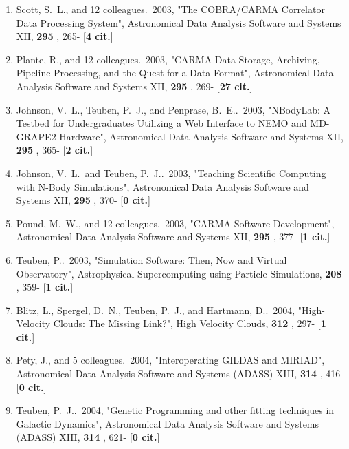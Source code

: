 \documentclass[11pt,letterpaper]{article}
\begin{document}
\begin{enumerate}[resume,label=\textbf{\arabic*}.]
\item  
Scott, S.~L., and 12 colleagues.\  2003,  "The COBRA/CARMA Correlator Data 
Processing System", Astronomical Data Analysis Software and Systems XII,  
{\bf 295} , 265- [{\bf 4 cit.}] 

\item  
Plante, R., and 12 colleagues.\  2003,  "CARMA Data Storage, Archiving, 
Pipeline Processing, and the Quest for a Data Format", Astronomical Data 
Analysis Software and Systems XII,  {\bf 295} , 269- [{\bf 27 cit.}] 

\item  
Johnson, V.~L., Teuben, P.~J., and Penprase, B.~E..\  2003,  "NBodyLab: A 
Testbed for Undergraduates Utilizing a Web Interface to NEMO and MD-GRAPE2 
Hardware", Astronomical Data Analysis Software and Systems XII,  {\bf 295} 
, 365- [{\bf 2 cit.}] 

\item  
Johnson, V.~L.~and Teuben, P.~J..\  2003,  "Teaching Scientific Computing 
with N-Body Simulations", Astronomical Data Analysis Software and Systems 
XII,  {\bf 295} , 370- [{\bf 0 cit.}] 

\item  
Pound, M.~W., and 12 colleagues.\  2003,  "CARMA Software Development", 
Astronomical Data Analysis Software and Systems XII,  {\bf 295} , 377- 
[{\bf 1 cit.}] 

\item  
Teuben, P..\  2003,  "Simulation Software: Then, Now and Virtual 
Observatory", Astrophysical Supercomputing using Particle Simulations,  
{\bf 208} , 359- [{\bf 1 cit.}] 


\item  
Blitz, L., Spergel, D.~N., Teuben, P.~J., and Hartmann, D..\  2004,  
"High-Velocity Clouds: The Missing Link?", High Velocity Clouds,  {\bf 312} 
, 297- [{\bf 1 cit.}] 

\item  
Pety, J., and 5 colleagues.\  2004,  "Interoperating GILDAS and MIRIAD", 
Astronomical Data Analysis Software and Systems (ADASS) XIII,  {\bf 314} , 
416- [{\bf 0 cit.}] 

\item  
Teuben, P.~J..\  2004,  "Genetic Programming and other fitting techniques 
in Galactic Dynamics", Astronomical Data Analysis Software and Systems 
(ADASS) XIII,  {\bf 314} , 621- [{\bf 0 cit.}] 


\end{enumerate}
\end{document}
